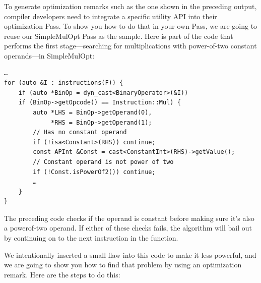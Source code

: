 To generate optimization remarks such as the one shown in the preceding output, compiler developers need to integrate a specific utility API into their optimization Pass. To show you how to do that in your own Pass, we are going to reuse our SimpleMulOpt Pass as the sample. Here is part of the code that performs the first stage—searching for multiplications with power-of-two constant operands—in SimpleMulOpt:

\begin{lstlisting}[style=styleCXX]
…
for (auto &I : instructions(F)) {
	if (auto *BinOp = dyn_cast<BinaryOperator>(&I))
	if (BinOp->getOpcode() == Instruction::Mul) {
		auto *LHS = BinOp->getOperand(0),
		     *RHS = BinOp->getOperand(1);
		// Has no constant operand
		if (!isa<Constant>(RHS)) continue;
		const APInt &Const = cast<ConstantInt>(RHS)->getValue();
		// Constant operand is not power of two
		if (!Const.isPowerOf2()) continue;
		…
	}
}
\end{lstlisting}

The preceding code checks if the operand is constant before making sure it's  also a powerof-two operand. If either of these checks fails, the algorithm will bail out by continuing on to the next instruction in the function.

We intentionally inserted a small flaw into this code to make it less powerful, and we are going to show you how to find that problem by using an optimization remark. Here are the steps to do this:

